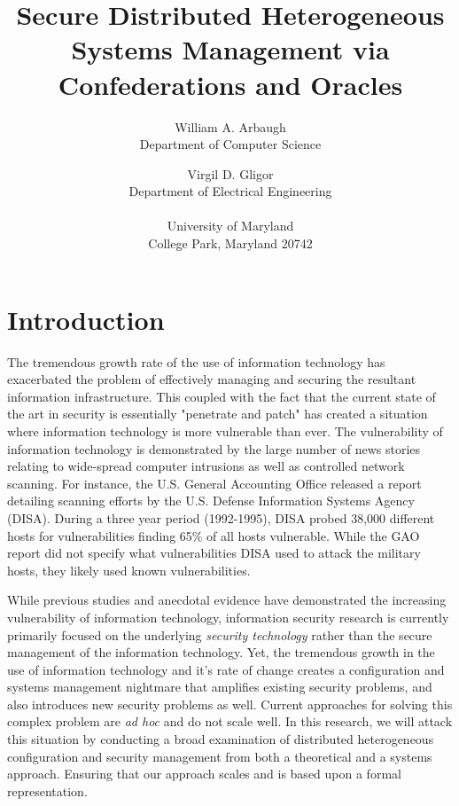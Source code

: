 \documentclass[10pt]{article}
\begin{document}
\title{Secure Distributed Heterogeneous Systems Management via Confederations and Oracles}
\author{William A. Arbaugh \\
	Department of Computer Science \\ 
	\and 
	Virgil D. Gligor \\
	Department of Electrical Engineering \\ 
	\\ 
	University of Maryland \\ 
	College Park, Maryland 20742 }
\date{}
\maketitle

\section{Introduction}

The tremendous growth rate of the use of information technology has
exacerbated the problem of effectively managing and securing the
resultant information infrastructure. This coupled with the fact that
the current state of the art in security is essentially "penetrate and
patch" has created a situation where information technology is more
vulnerable than ever\cite{Oakland-consensus}. The vulnerability of
information technology is demonstrated by the large number of news
stories relating to wide-spread computer intrusions as well as
controlled network scanning\cite{drogin99}\cite{IAP}. For instance,
the U.S. General Accounting Office released a report detailing
scanning efforts by the U.S. Defense Information Systems Agency
(DISA)\cite{GAO96}. During a three year period (1992-1995), DISA
probed 38,000 different hosts for vulnerabilities finding 65\% of all
hosts vulnerable. While the GAO report did not specify what
vulnerabilities DISA used to attack the military hosts, they likely
used known vulnerabilities.

While previous studies and anecdotal evidence have demonstrated the
increasing vulnerability of information technology, information
security research is currently primarily focused on the underlying
{\it security technology} rather than the secure management of the
information technology. Yet, the tremendous growth in the use of
information technology and it's rate of change creates a configuration
and systems management nightmare that amplifies existing security
problems, and also introduces new security problems as well. Current
approaches for solving this complex problem are {\it ad hoc} and do
not scale well. In this research, we will attack this situation by
conducting a broad examination of distributed heterogeneous
configuration and security management from both a theoretical and a
systems approach. Ensuring that our approach scales and is based upon
a formal representation.
\end{document}
